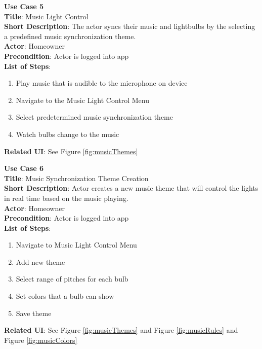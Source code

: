\documentclass[12pt]{article}
\begin{document}
\begin{samepage}
  \begin{framed}
    \textbf{Use Case 5} \\
    \textbf{Title}: Music Light Control \\
    \textbf{Short Description}: The actor syncs their music and lightbulbs by the selecting a predefined music synchronization theme.\\
    \textbf{Actor}: Homeowner \\
    \textbf{Precondition}: Actor is logged into app \\
    \textbf{List of Steps}:
    \begin{enumerate}
      \item Play music that is audible to the microphone on device
      \item Navigate to the Music Light Control Menu
      \item Select predetermined music synchronization theme
      \item Watch bulbs change to the music
    \end{enumerate}
    \textbf{Related UI}: See Figure \ref{fig:musicThemes} 
  \end{framed}
\end{samepage}

\begin{samepage}
  \begin{framed}
    \textbf{Use Case 6} \\
    \textbf{Title}: Music Synchronization Theme Creation \\
    \textbf{Short Description}:  Actor creates a new music theme that will control the lights in real time based on the music playing. \\
    \textbf{Actor}: Homeowner \\
    \textbf{Precondition}: Actor is logged into app \\
    \textbf{List of Steps}: 
    \begin{enumerate}
        \item Navigate to Music Light Control Menu
        \item Add new theme
        \item Select range of pitches for each bulb
        \item Set colors that a bulb can show
        \item Save theme
    \end{enumerate}
    \textbf{Related UI}:  See Figure \ref{fig:musicThemes} and Figure \ref{fig:musicRules} and Figure \ref{fig:musicColors} 
  \end{framed}
\end{samepage}
\end{document}

